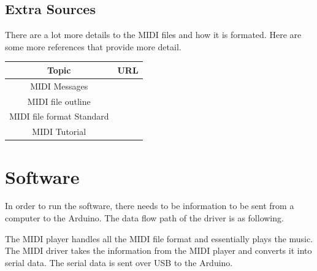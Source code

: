 \documentclass[11pt, a4paper]{report}
\begin{document}
\section{Extra Sources}

There are a lot more details to the MIDI files and how it is formated. Here are some more references that provide more detail. \\


\begin{center}
 \begin{tabular}{|c | c |} 
 \hline
  Topic & URL \\
  \hline
  MIDI Messages & \cite{MIDIMessage} \\
  \hline
  MIDI file outline & \cite{MIDIFileOutline} \\ 

  \hline
   MIDI file format Standard &  \cite{MIDIFormat} \\
   \hline
   MIDI Tutorial & \cite{MIDITutorial}\\ 
   \hline
\end{tabular}
\end{center}

\chapter{Software}

In order to run the software, there needs to be information to be sent from a computer to the Arduino. The data flow path of the driver is as following. 

\begin{center}
\end{center}

The MIDI player handles all the MIDI file format and essentially plays the music. The MIDI driver takes the information from the MIDI player and converts it into serial data. The serial data is sent over USB to the Arduino. \\
\end{document}
